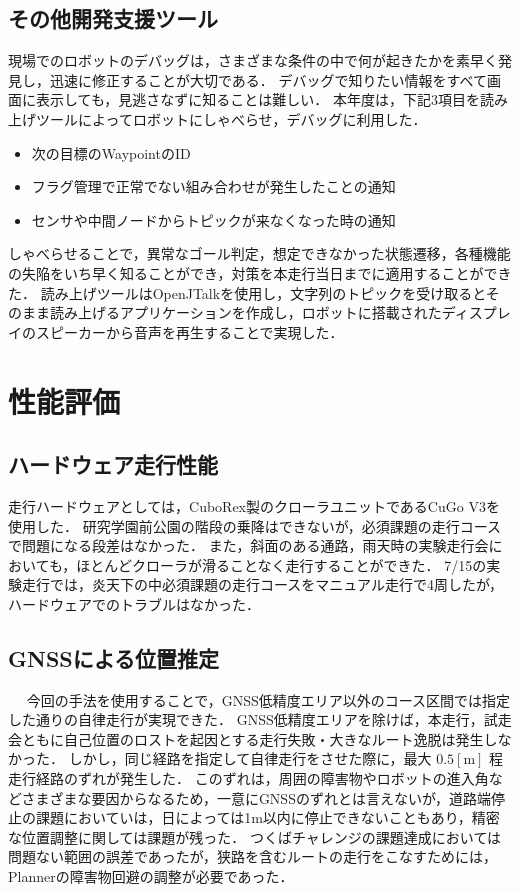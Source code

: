 \documentclass[platex,dvipdfmx]{rbproceedings}
\begin{document}
\subsection{その他開発支援ツール}
現場でのロボットのデバッグは，さまざまな条件の中で何が起きたかを素早く発見し，迅速に修正することが大切である．
デバッグで知りたい情報をすべて画面に表示しても，見逃さなずに知ることは難しい．
本年度は，下記3項目を読み上げツールによってロボットにしゃべらせ，デバッグに利用した．
\begin{itemize}
    \item 次の目標のWaypointのID
    \item フラグ管理で正常でない組み合わせが発生したことの通知
    \item センサや中間ノードからトピックが来なくなった時の通知
\end{itemize}
しゃべらせることで，異常なゴール判定，想定できなかった状態遷移，各種機能の失陥をいち早く知ることができ，対策を本走行当日までに適用することができた．
読み上げツールはOpenJTalk\cite{openjtalk}を使用し，文字列のトピックを受け取るとそのまま読み上げるアプリケーションを作成し，ロボットに搭載されたディスプレイのスピーカーから音声を再生することで実現した．

\section{性能評価}
\subsection{ハードウェア走行性能}
走行ハードウェアとしては，CuboRex製のクローラユニットであるCuGo V3を使用した．
研究学園前公園の階段の乗降はできないが，必須課題の走行コースで問題になる段差はなかった．
また，斜面のある通路，雨天時の実験走行会においても，ほとんどクローラが滑ることなく走行することができた．
7/15の実験走行では，炎天下の中必須課題の走行コースをマニュアル走行で4周したが，ハードウェアでのトラブルはなかった．

\subsection{GNSSによる位置推定}　\label{ss:gnss_eval}
今回の手法を使用することで，GNSS低精度エリア以外のコース区間では指定した通りの自律走行が実現できた．
GNSS低精度エリアを除けば，本走行，試走会ともに自己位置のロストを起因とする走行失敗・大きなルート逸脱は発生しなかった．
しかし，同じ経路を指定して自律走行をさせた際に，最大 $0.5[\mathrm{m}]$ 程走行経路のずれが発生した．
このずれは，周囲の障害物やロボットの進入角などさまざまな要因からなるため，一意にGNSSのずれとは言えないが，道路端停止の課題においていは，日によっては1m以内に停止できないこともあり，精密な位置調整に関しては課題が残った．
つくばチャレンジの課題達成においては問題ない範囲の誤差であったが，狭路を含むルートの走行をこなすためには，Plannerの障害物回避の調整が必要であった．
\end{document}
